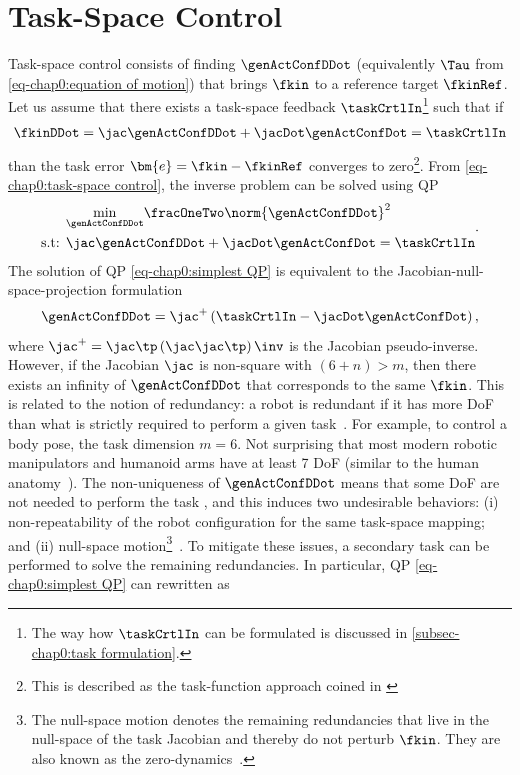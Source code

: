\section{Task-Space Control}
Task-space control consists of finding  $\genActConfDDot$ (equivalently $\Tau$ from \cref{eq-chap0:equation of motion}) that brings $\fkin$ to a reference target $\fkinRef$.
Let us assume that there exists a task-space feedback $\taskCrtlIn$\footnote{The way how $\taskCrtlIn$ can be formulated is discussed in  \cref{subsec-chap0:task formulation}.} such that if 
\begin{align}\label{eq-chap0:task-space control}
	\fkinDDot = \jac\genActConfDDot + \jacDot\genActConfDot= \taskCrtlIn
\end{align} than the task error $\bm{e} = \fkin - \fkinRef$ converges to zero\footnote{This is described as  the task-function approach coined in \cite{samson1990ifac,samson1991book}}.
From \cref{eq-chap0:task-space control}, the inverse problem can be solved using  QP 
\begin{align}\label{eq-chap0:simplest QP}
	\begin{split}
	&\underset{\genActConfDDot}{\min}\fracOneTwo \norm{\genActConfDDot}^2 \\ 
	\text{s.t: }&  \jac\genActConfDDot + \jacDot\genActConfDot= \taskCrtlIn
	\end{split}.
\end{align} 
The solution of QP \cref{eq-chap0:simplest QP} is equivalent to the Jacobian-null-space-projection formulation~\cite{dietrich2015ijrr} 
\begin{equation}\label{eq-chap0:null-space projection}
	\genActConfDDot = \jac^{+}\left(\taskCrtlIn- \jacDot\genActConfDot\right),
\end{equation} where $\jac^+ = \jac\tp\left(\jac\jac\tp\right)\inv$ is the Jacobian pseudo-inverse.
However, if the Jacobian $\jac$ is non-square with $(6+n)>m$, then there exists an infinity of $\genActConfDDot$ that corresponds to the same $\fkin$. This is related to the notion of redundancy: a robot is redundant if it has more DoF than what is strictly required to perform a given task~\cite{deluca1991springer,chiaverini1991roboticsandAutonomousSystems,antonelli1998icra,chiaverini2019springer}. For example, to control a body pose, the task dimension $m=6$. Not surprising that most modern robotic manipulators and humanoid arms have at least 7 DoF (similar to the human anatomy~\cite{chiaverini1991ras}). 
The non-uniqueness of $\genActConfDDot$ means that some DoF are not needed to perform the task \cite{wieber2017springer}, and this induces two undesirable behaviors: (i) non-repeatability of the robot configuration for the same task-space mapping; and (ii) null-space motion\footnote{The null-space motion denotes the remaining redundancies that live in the null-space of the task Jacobian and thereby do not perturb $\fkin$. They are also known as the zero-dynamics~\cite{varghese1990icse,varghese1991taes}.}~\cite{deluca1991springer}. To mitigate these issues, a secondary task can be performed to solve the remaining redundancies. In particular, QP \cref{eq-chap0:simplest QP} can rewritten as 
